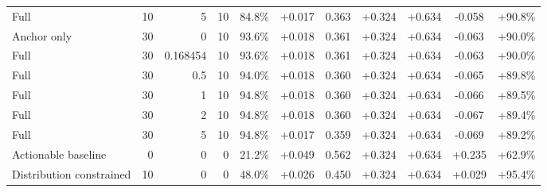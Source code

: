 \begin{table}[htbp]
\begin{tabular}{lrrrccccccc}
Full & 10 & 5 & 10 & 84.8\% & +0.017 & 0.363 & +0.324 & +0.634 & -0.058 & +90.8\% \\
Anchor only & 30 & 0 & 10 & 93.6\% & +0.018 & 0.361 & +0.324 & +0.634 & -0.063 & +90.0\% \\
Full & 30 & 0.168454 & 10 & 93.6\% & +0.018 & 0.361 & +0.324 & +0.634 & -0.063 & +90.0\% \\
Full & 30 & 0.5 & 10 & 94.0\% & +0.018 & 0.360 & +0.324 & +0.634 & -0.065 & +89.8\% \\
Full & 30 & 1 & 10 & 94.8\% & +0.018 & 0.360 & +0.324 & +0.634 & -0.066 & +89.5\% \\
Full & 30 & 2 & 10 & 94.8\% & +0.018 & 0.360 & +0.324 & +0.634 & -0.067 & +89.4\% \\
Full & 30 & 5 & 10 & 94.8\% & +0.017 & 0.359 & +0.324 & +0.634 & -0.069 & +89.2\% \\
Actionable baseline & 0 & 0 & 0 & 21.2\% & +0.049 & 0.562 & +0.324 & +0.634 & +0.235 & +62.9\% \\
Distribution constrained & 10 & 0 & 0 & 48.0\% & +0.026 & 0.450 & +0.324 & +0.634 & +0.029 & +95.4\% \\
\bottomrule
\end{tabular}
\end{table}